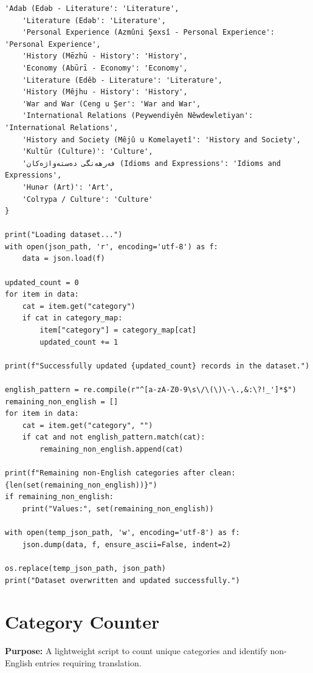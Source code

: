 \documentclass[11pt]{article}
\begin{document}
\begin{lstlisting}[style=pythoncode, caption={clean\_categories\_final.py}]
    'Adab (Edəb - Literature': 'Literature',
    'Literature (Edəb': 'Literature',
    'Personal Experience (Azmûni Şexsî - Personal Experience': 'Personal Experience',
    'History (Mēzhū - History': 'History',
    'Economy (Abūrī - Economy': 'Economy',
    'Literature (Edêb - Literature': 'Literature',
    'History (Mêjhu - History': 'History',
    'War and War (Ceng u Şer': 'War and War',
    'International Relations (Peywendiyên Nêwdewletiyan': 'International Relations',
    'History and Society (Mêjû u Komelayetî': 'History and Society',
    'Kultūr (Culture)': 'Culture',
    'فەرھەنگی دەستەواژەکان (Idioms and Expressions': 'Idioms and Expressions',
    'Hunər (Art)': 'Art',
    'Colтура / Culture': 'Culture'
}

print("Loading dataset...")
with open(json_path, 'r', encoding='utf-8') as f:
    data = json.load(f)

updated_count = 0
for item in data:
    cat = item.get("category")
    if cat in category_map:
        item["category"] = category_map[cat]
        updated_count += 1

print(f"Successfully updated {updated_count} records in the dataset.")

english_pattern = re.compile(r"^[a-zA-Z0-9\s\/\(\)\-\.,&:\?!_']*$")
remaining_non_english = []
for item in data:
    cat = item.get("category", "")
    if cat and not english_pattern.match(cat):
        remaining_non_english.append(cat)

print(f"Remaining non-English categories after clean: {len(set(remaining_non_english))}")
if remaining_non_english:
    print("Values:", set(remaining_non_english))

with open(temp_json_path, 'w', encoding='utf-8') as f:
    json.dump(data, f, ensure_ascii=False, indent=2)

os.replace(temp_json_path, json_path)
print("Dataset overwritten and updated successfully.")
\end{lstlisting}


\section{Category Counter} \label{sec:counter}
\textbf{Purpose:} A lightweight script to count unique categories and identify non-English entries requiring translation.
\end{document}
